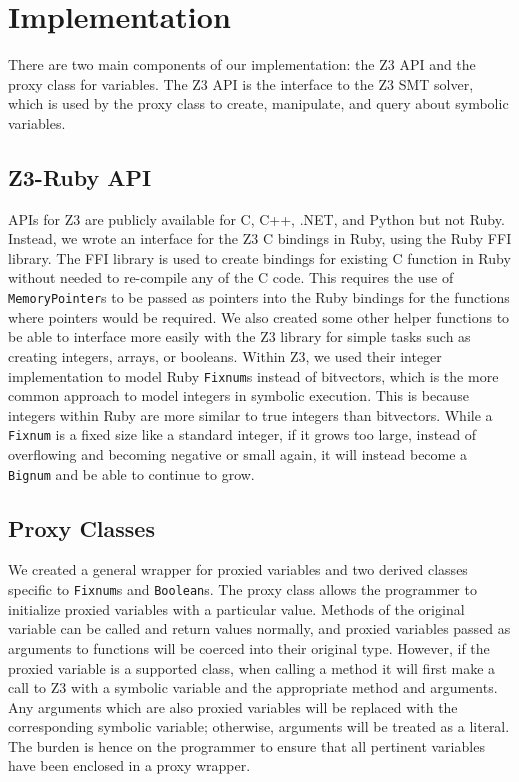 \documentclass[10pt]{article}
\begin{document}
\section{Implementation}
There are two main components of our implementation: the Z3 API and the proxy class for variables.  The Z3 API is the interface to the Z3 SMT solver, which is used by the proxy class to create, manipulate, and query about symbolic variables.\\

\subsection{Z3-Ruby API}
APIs for Z3 are publicly available for C, C++, .NET, and Python \textemdash but not Ruby.  Instead, we wrote an interface for the Z3 C bindings in Ruby, using the Ruby FFI library.  The FFI library is used to create bindings for existing C function in Ruby without needed to re-compile any of the C code.  This requires the use of \texttt{MemoryPointer}s to be passed as pointers into the Ruby bindings for the functions where pointers would be required.  We also created some other helper functions to be able to interface more easily with the Z3 library for simple tasks such as creating integers, arrays, or booleans.  Within Z3, we used their integer implementation to model Ruby \texttt{Fixnum}s instead of bitvectors, which is the more common approach to model integers in symbolic execution.  This is because integers within Ruby are more similar to true integers than bitvectors.  While a \texttt{Fixnum} is a fixed size like a standard integer, if it grows too large, instead of overflowing and becoming negative or small again, it will instead become a \texttt{Bignum} and be able to continue to grow.\\

\subsection{Proxy Classes}
We created a general wrapper for proxied variables and two derived classes specific to \texttt{Fixnum}s and \texttt{Boolean}s.  The proxy class allows the programmer to initialize proxied variables with a particular value.  Methods of the original variable can be called and return values normally, and proxied variables passed as arguments to functions will be coerced into their original type.  However, if the proxied variable is a supported class, when calling a method it will first make a call to Z3 with a symbolic variable and the appropriate method and arguments.  Any arguments which are also proxied variables will be replaced with the corresponding symbolic variable; otherwise, arguments will be treated as a literal.  The burden is hence on the programmer to ensure that all pertinent variables have been enclosed in a proxy wrapper.\\
\end{document}
